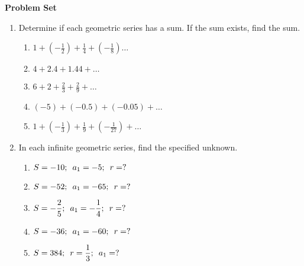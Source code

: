 \textbf{Problem Set }

\vspce

\begin{enumerate}[label = \Alph*. ]
\item Determine if each geometric series has a sum. If the sum exists, find the sum.     
  
\begin{enumerate}[label = \arabic*. ]
%

	\item \hspce $\displaystyle 1+(-\frac{1}{2})+\frac{1}{4}+(-\frac{1}{8})\ldots$

	\item \hspce $4+2.4+1.44+\ldots$
	\item \hspce $\displaystyle 6+2+\frac{2}{3}+\frac{2}{9}+\ldots$
		\item \hspce $(-5)+(-0.5)+(-0.05)+\ldots$
	\item \hspce $\displaystyle 1+(-\frac{1}{3}) +\frac{1}{9}+(-\frac{1}{27}) + \ldots$
%	
	
\end{enumerate}

\vspce

\item In each infinite geometric series, find the specified unknown.    

\begin{enumerate}[label = \arabic*. ]
%

\item \hspce $\displaystyle S=-10; \hspace{0.5em} a_1=-5;\hspace{0.5em} r=?$
\item \hspce $\displaystyle S=-52; \hspace{0.5em} a_1=-65;\hspace{0.5em} r=?$
\item \hspce $\displaystyle S=-\frac{2}{5}; \hspace{0.5em} a_1=-\frac{1}{4};\hspace{0.5em} r=? $
\item \hspce $\displaystyle S=-36; \hspace{0.5em} a_1=-60;\hspace{0.5em} r=?$  
\item \hspce $\displaystyle S=384;\hspace{0.5em}  r=\frac{1}{3};\hspace{0.5em} a_1=? $

%	
\end{enumerate}
\end{enumerate}




